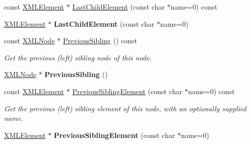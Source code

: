 \begin{DoxyCompactItemize}
\item 
const \hyperlink{classtinyxml2_1_1_x_m_l_element}{X\+M\+L\+Element} $\ast$ \hyperlink{classtinyxml2_1_1_x_m_l_node_a91a59df4ae1b4eb7f573c0a4cfc81bee}{Last\+Child\+Element} (const char $\ast$name=0) const 
\item 
\hyperlink{classtinyxml2_1_1_x_m_l_element}{X\+M\+L\+Element} $\ast$ {\bfseries Last\+Child\+Element} (const char $\ast$name=0)\hypertarget{classtinyxml2_1_1_x_m_l_node_a1b77a8194d059665a4412ebfea276878}{}\label{classtinyxml2_1_1_x_m_l_node_a1b77a8194d059665a4412ebfea276878}

\item 
const \hyperlink{classtinyxml2_1_1_x_m_l_node}{X\+M\+L\+Node} $\ast$ \hyperlink{classtinyxml2_1_1_x_m_l_node_a4cb1bf63e9de55129d21a7be60685fd4}{Previous\+Sibling} () const \hypertarget{classtinyxml2_1_1_x_m_l_node_a4cb1bf63e9de55129d21a7be60685fd4}{}\label{classtinyxml2_1_1_x_m_l_node_a4cb1bf63e9de55129d21a7be60685fd4}

\begin{DoxyCompactList}\small\item\em Get the previous (left) sibling node of this node. \end{DoxyCompactList}\item 
\hyperlink{classtinyxml2_1_1_x_m_l_node}{X\+M\+L\+Node} $\ast$ {\bfseries Previous\+Sibling} ()\hypertarget{classtinyxml2_1_1_x_m_l_node_ae760e5e7e766df1d2cf3bb4a847876d6}{}\label{classtinyxml2_1_1_x_m_l_node_ae760e5e7e766df1d2cf3bb4a847876d6}

\item 
const \hyperlink{classtinyxml2_1_1_x_m_l_element}{X\+M\+L\+Element} $\ast$ \hyperlink{classtinyxml2_1_1_x_m_l_node_aae864cedca1b711cf0e357fd6504a6d8}{Previous\+Sibling\+Element} (const char $\ast$name=0) const \hypertarget{classtinyxml2_1_1_x_m_l_node_aae864cedca1b711cf0e357fd6504a6d8}{}\label{classtinyxml2_1_1_x_m_l_node_aae864cedca1b711cf0e357fd6504a6d8}

\begin{DoxyCompactList}\small\item\em Get the previous (left) sibling element of this node, with an optionally supplied name. \end{DoxyCompactList}\item 
\hyperlink{classtinyxml2_1_1_x_m_l_element}{X\+M\+L\+Element} $\ast$ {\bfseries Previous\+Sibling\+Element} (const char $\ast$name=0)\hypertarget{classtinyxml2_1_1_x_m_l_node_ae4f37eb6cd405bdf1d57caa066e36d87}{}\label{classtinyxml2_1_1_x_m_l_node_ae4f37eb6cd405bdf1d57caa066e36d87}


\end{DoxyCompactItemize}
